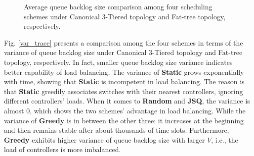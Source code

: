 \documentclass[10pt,journal,compsoc]{IEEEtran}
\begin{document}
\begin{figure}[!t]
\centering
 \caption{Average queue backlog size comparison among four scheduling schemes under Canonical 3-Tiered topology and Fat-tree topology, respectively.}
 \label{qlen_trace}
\end{figure}

Fig. \ref{var_trace} presents a comparison among the four schemes in terms of the variance of queue backlog size under Canonical 3-Tiered topology and Fat-tree topology, respectively. In fact, smaller queue backlog size variance indicates better capability of load balancing. The variance of \textbf{Static} grows exponentially with time, showing that \textbf{Static} is incompetent in load balancing. The reason is that \textbf{Static} greedily associates switches with their nearest controllers, ignoring different controllers' loads. When it comes to \textbf{Random} and \textbf{JSQ}, the variance is almost $0$, which shows the two schemes' advantage in load balancing. While the variance of \textbf{Greedy} is in between the other three: it increases at the beginning and then remains stable after about thousands of time slots. Furthermore, \textbf{Greedy} exhibits higher variance of queue backlog size with larger $V$, i.e., the load of controllers is more imbalanced. 
\end{document}
